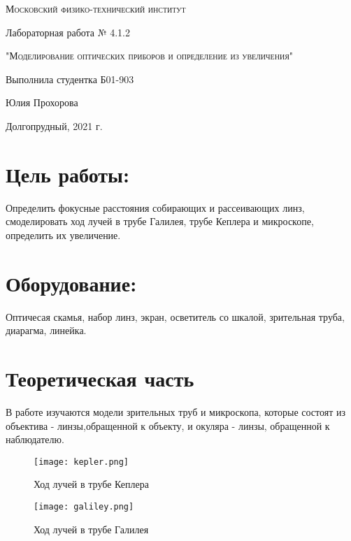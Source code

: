 \documentclass[12pt,a4paper]{article}
\begin{document}
\begin{titlepage}
	\centering
	\vspace{5cm}
	{\scshape\LARGE Московский физико-технический институт \par}
	\vspace{5cm}

	{\huge Лабораторная работа № 4.1.2 \par}
	\vspace{1cm}
	{\scshape\Large "Моделирование оптических приборов и определение из увеличения"\par}
	\vspace{2cm}
	\vfill
\begin{flushright}
	{\Large Выполнила студентка Б01-903}\par
	\vspace{0.3cm}
	{\LARGE Юлия Прохорова} \par

	
\end{flushright}
	

	\vfill\large

	Долгопрудный, 2021 г.
\end{titlepage}

\section{Цель работы:}
Определить фокусные расстояния собирающих и рассеивающих линз, смоделировать ход лучей в трубе Галилея, 
трубе Кеплера и микроскопе, определить их увеличение.

\section{Оборудование:}
Оптичесая скамья, набор линз, экран, осветитель со шкалой, зрительная труба, диарагма, линейка.

\section{Теоретическая часть}

В работе изучаются модели зрительных труб и микроскопа, которые состоят из объектива - линзы,обращенной
 к объекту, и окуляра - линзы, обращенной к наблюдателю.

\begin{figure}[h]
    \begin{center}
    \begin{minipage}[h]{0.4\linewidth}
    \texttt{[image: kepler.png]}
    \caption{Ход лучей в трубе Кеплера}
    \label{kepler}
    \end{minipage}
    \hfill
    \begin{minipage}[h]{0.45\linewidth}
    \texttt{[image: galiley.png]}
    \caption{Ход лучей в трубе Галилея}
    \label{galiley}
    \end{minipage}
    \end{center}
\end{figure}
\end{document}
